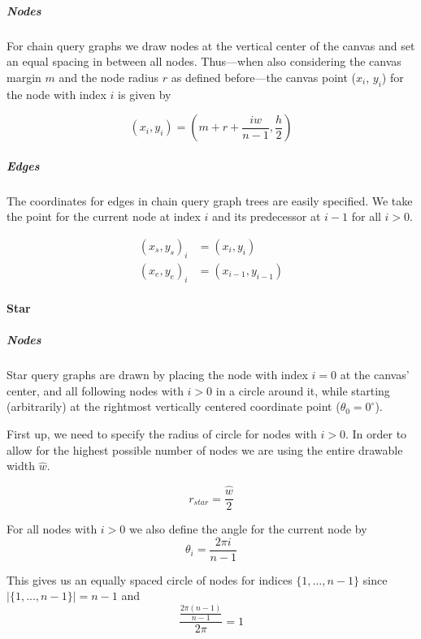\subparagraph{Nodes} For chain query graphs we draw nodes at the vertical center of the canvas and set an equal spacing in between all nodes. Thus—when also considering the canvas margin $m$ and the node radius $r$ as defined before—the canvas point ($x_i$, $y_i$) for the node with index $i$ is given by

\begin{equation}
    (x_i, y_i) = (m + r + \frac{i\hat{w}}{n - 1}, \frac{h}{2})
\end{equation}

\subparagraph{Edges}

The coordinates for edges in chain query graph trees are easily specified. We take the point for the current node at index $i$ and its predecessor at $i-1$ for all $i > 0$.

\begin{equation}
    \begin{aligned}
        (x_s, y_s)_i &= (x_i, y_i)\\   
        (x_e, y_e)_i &= (x_{i-1}, y_{i-1})
    \end{aligned}
\end{equation}

\paragraph{Star} 

\subparagraph{Nodes} Star query graphs are drawn by placing the node with index $i = 0$ at the canvas' center, and all following nodes with $i > 0$ in a circle around it, while starting (arbitrarily) at the rightmost vertically centered coordinate point ($\theta_0 = 0^{\circ}$).

First up, we need to specify the radius of circle for nodes with $i > 0$. In order to allow for the highest possible number of nodes we are using the entire drawable width $\hat{w}$.

\begin{equation}\label{eqn:painting-r_star}
    r_{star} = \frac{\hat{w}}{2}
\end{equation}

For all nodes with $i > 0$ we also define the angle for the current node by
\begin{equation}\label{eqn:painting-theta}
    \theta_i = \frac{2\pi i}{n - 1}
\end{equation}

This gives us an equally spaced circle of nodes for indices $\{1,\dots,n-1\}$ since $\vert\{1,...,n-1\}\vert = n-1$ and
\begin{equation}
    \frac{\frac{2\pi(n-1)}{n-1}}{2\pi} = 1   
\end{equation}

